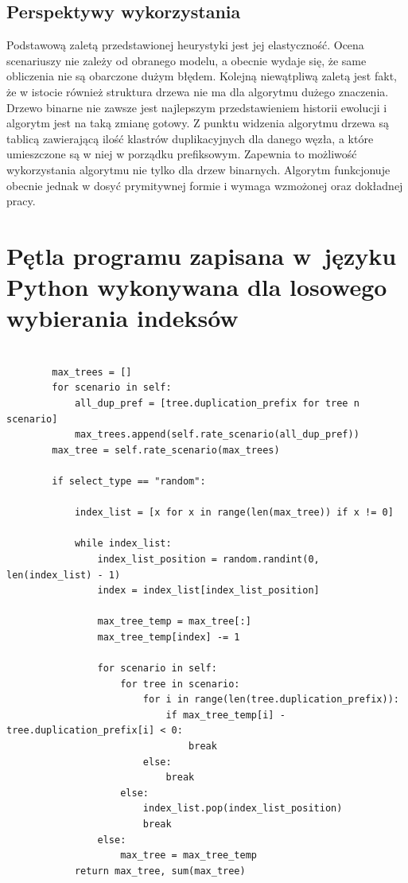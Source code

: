 \documentclass[licencjacka]{pracamgr}
\begin{document}
\section{Perspektywy wykorzystania}

Podstawową zaletą przedstawionej heurystyki jest jej elastyczność. Ocena scenariuszy nie zależy od obranego modelu, a obecnie wydaje się, że same obliczenia nie są obarczone dużym błędem. Kolejną niewątpliwą zaletą jest fakt, że w istocie również struktura drzewa nie ma dla algorytmu dużego znaczenia. Drzewo binarne nie zawsze jest najlepszym przedstawieniem historii ewolucji i algorytm jest na taką zmianę gotowy. Z punktu widzenia algorytmu drzewa są tablicą zawierającą ilość klastrów duplikacyjnych dla danego węzła, a które umieszczone są w niej w porządku prefiksowym. Zapewnia to możliwość wykorzystania algorytmu nie tylko dla drzew binarnych. Algorytm funkcjonuje obecnie jednak w dosyć prymitywnej formie i wymaga wzmożonej oraz dokładnej pracy.  

\appendix

\chapter{Pętla programu zapisana w~języku Python wykonywana dla losowego wybierania indeksów}

\begin{verbatim}

		max_trees = []
        for scenario in self:
            all_dup_pref = [tree.duplication_prefix for tree n scenario]
            max_trees.append(self.rate_scenario(all_dup_pref))
        max_tree = self.rate_scenario(max_trees)

        if select_type == "random":

            index_list = [x for x in range(len(max_tree)) if x != 0]

            while index_list:
                index_list_position = random.randint(0, len(index_list) - 1)
                index = index_list[index_list_position]

                max_tree_temp = max_tree[:]
                max_tree_temp[index] -= 1

                for scenario in self:
                    for tree in scenario:
                        for i in range(len(tree.duplication_prefix)):
                            if max_tree_temp[i] - tree.duplication_prefix[i] < 0:
                                break
                        else:
                            break
                    else:
                        index_list.pop(index_list_position)
                        break
                else:
                    max_tree = max_tree_temp
            return max_tree, sum(max_tree)
\end{verbatim}
\end{document}
